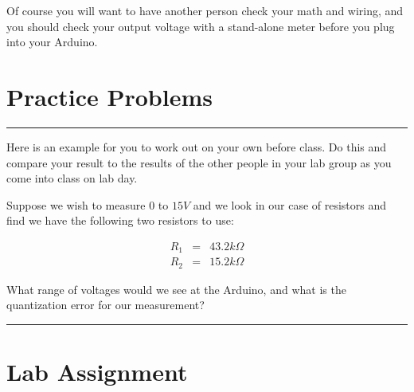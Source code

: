 \bigskip Of course you will want to have another person check your math and
wiring, and you should check your output voltage with a stand-alone meter
before you plug into your Arduino.

\section{Practice Problems}

\rule{11cm}{0.03cm}

Here is an example for you to work out on your own before class. Do this and compare your result to the results of the other people in your lab group as you come into class on lab day.

Suppose we wish to measure $0$ to $15\unit{V}$ and we look in our case of resistors and find we have the following two resistors to use:

\begin{eqnarray*}
	R_{1} &=&43.2\unit{k\Omega} \\
	R_{2} &=&15.2\unit{k\Omega}
\end{eqnarray*}

What range of voltages would we see at the Arduino, and what is the quantization error for our measurement?

\rule{11cm}{0.03cm}





\vspace*{\fill}

\pagebreak

\section{Lab Assignment}

